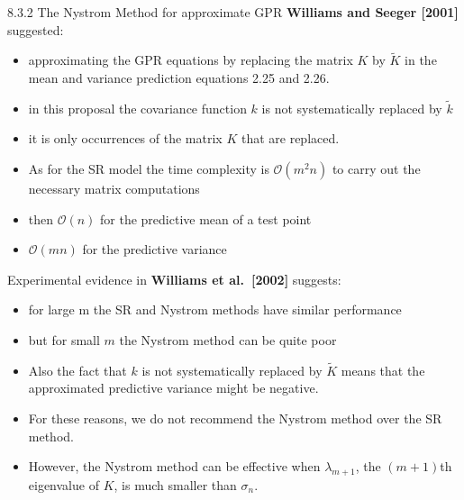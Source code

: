 \documentclass[
  ignorenonframetext,
]{beamer}
\begin{document}
\begin{frame}{8.3.2 The Nystrom Method for approximate GPR}
\protect\hypertarget{the-nystrom-method-for-approximate-gpr}{}
\textbf{Williams and Seeger {[}2001{]}} suggested:

\begin{itemize}
\item
  approximating the GPR equations by replacing the matrix \(K\) by
  \({\tilde K}\) in the mean and variance prediction equations 2.25 and
  2.26.
\item
  in this proposal the covariance function \(k\) is not systematically
  replaced by \({\tilde k}\)
\item
  it is only occurrences of the matrix \(K\) that are replaced.
\item
  As for the SR model the time complexity is \(\mathcal O(m^2n)\) to
  carry out the necessary matrix computations
\item
  then \(\mathcal O(n)\) for the predictive mean of a test point
\item
  \(\mathcal O(mn)\) for the predictive variance
\end{itemize}
\end{frame}

\begin{frame}{}
\protect\hypertarget{section-14}{}
Experimental evidence in \textbf{Williams et al.~{[}2002{]}} suggests:

\begin{itemize}
\item
  for large m the SR and Nystrom methods have similar performance
\item
  but for small \(m\) the Nystrom method can be quite poor
\item
  Also the fact that \(k\) is not systematically replaced by
  \({\tilde K}\) means that the approximated predictive variance might
  be negative.
\item
  For these reasons, we do not recommend the Nystrom method over the SR
  method.
\item
  However, the Nystrom method can be effective when \({\lambda}_{m+1}\),
  the \((m + 1)\)th eigenvalue of \(K\), is much smaller than
  \(\sigma_n\).
\end{itemize}
\end{frame}
\end{document}
